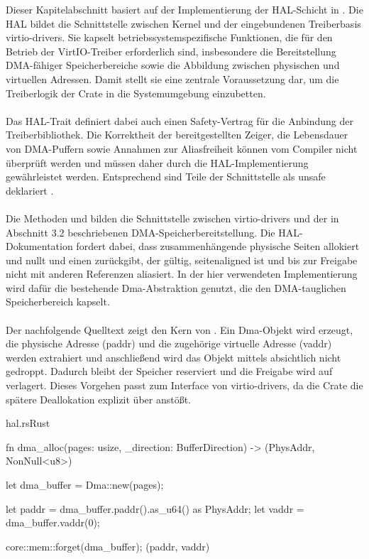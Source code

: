 Dieser Kapitelabschnitt basiert auf der Implementierung der HAL-Schicht in . Die HAL bildet die Schnittstelle zwischen Kernel und der eingebundenen Treiberbasis virtio-drivers. Sie kapselt betriebssystemspezifische Funktionen, die für den Betrieb der VirtIO-Treiber erforderlich sind, insbesondere die Bereitstellung DMA-fähiger Speicherbereiche sowie die Abbildung zwischen physischen und virtuellen Adressen. Damit stellt sie eine zentrale Voraussetzung dar, um die Treiberlogik der Crate in die Systemumgebung einzubetten.\\
\\
Das HAL-Trait definiert dabei auch einen Safety-Vertrag für die Anbindung der Treiberbibliothek. Die Korrektheit der bereitgestellten Zeiger, die Lebensdauer von DMA-Puffern sowie Annahmen zur Aliasfreiheit können vom Compiler nicht überprüft werden und müssen daher durch die HAL-Implementierung gewährleistet werden. Entsprechend sind Teile der Schnittstelle als unsafe deklariert \cite{VirtioDriversHalInfo}.\\
\\
Die Methoden  und  bilden die Schnittstelle zwischen virtio-drivers und der in Abschnitt 3.2 beschriebenen DMA-Speicherbereitstellung. Die HAL-Dokumentation fordert dabei, dass  zusammenhängende physische Seiten allokiert und nullt und einen  zurückgibt, der gültig, seitenaligned ist und bis zur Freigabe nicht mit anderen Referenzen aliasiert. In der hier verwendeten Implementierung wird dafür die bestehende Dma-Abstraktion genutzt, die den DMA-tauglichen Speicherbereich kapselt.\\
\\
Der nachfolgende Quelltext zeigt den Kern von . Ein Dma-Objekt wird erzeugt, die physische Adresse (paddr) und die zugehörige virtuelle Adresse (vaddr) werden extrahiert und anschließend wird das Objekt mittels  absichtlich nicht gedroppt. Dadurch bleibt der Speicher reserviert und die Freigabe wird auf  verlagert. Dieses Vorgehen passt zum Interface von virtio-drivers, da die Crate die spätere Deallokation explizit über  anstößt.

\begin{codeblock}{hal.rs}{Rust}
  \begin{rustcode}
fn dma_alloc(pages: usize, _direction: BufferDirection) -> (PhysAddr, NonNull<u8>) {
    let dma_buffer = Dma::new(pages);

    let paddr = dma_buffer.paddr().as_u64() as PhysAddr;
    let vaddr = dma_buffer.vaddr(0);

    core::mem::forget(dma_buffer);
    (paddr, vaddr)
}
  \end{rustcode}
\end{codeblock}


